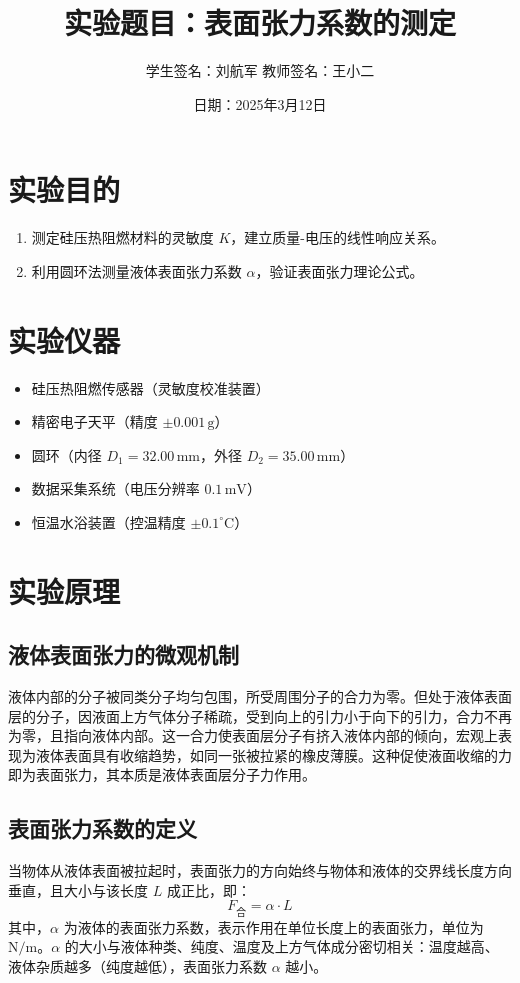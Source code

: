 \documentclass[12pt,a4paper]{article}
\title{实验题目：表面张力系数的测定}
\author{学生签名：刘航军 \quad 教师签名：王小二}
\date{日期：2025年3月12日}
\begin{document}
\maketitle

\section{实验目的}
\begin{enumerate}
\item 测定硅压热阻燃材料的灵敏度 $K$，建立质量-电压的线性响应关系。
\item 利用圆环法测量液体表面张力系数 $\alpha$，验证表面张力理论公式。
\end{enumerate}

\section{实验仪器}
\begin{itemize}
\item 硅压热阻燃传感器（灵敏度校准装置）
\item 精密电子天平（精度 $\pm 0.001 \, \text{g}$）
\item 圆环（内径 $D_1 = 32.00 \, \text{mm}$，外径 $D_2 = 35.00 \, \text{mm}$）
\item 数据采集系统（电压分辨率 $0.1 \, \text{mV}$）
\item 恒温水浴装置（控温精度 $\pm 0.1^\circ \text{C}$）
\end{itemize}

\section{实验原理}

\subsection{液体表面张力的微观机制}
液体内部的分子被同类分子均匀包围，所受周围分子的合力为零。但处于液体表面层的分子，因液面上方气体分子稀疏，受到向上的引力小于向下的引力，合力不再为零，且指向液体内部。这一合力使表面层分子有挤入液体内部的倾向，宏观上表现为液体表面具有收缩趋势，如同一张被拉紧的橡皮薄膜。这种促使液面收缩的力即为表面张力，其本质是液体表面层分子力作用。

\subsection{表面张力系数的定义}
当物体从液体表面被拉起时，表面张力的方向始终与物体和液体的交界线长度方向垂直，且大小与该长度 $L$ 成正比，即：
\begin{equation}
F_{\text{合}} = \alpha \cdot L
\end{equation}
其中，$\alpha$ 为液体的表面张力系数，表示作用在单位长度上的表面张力，单位为 $\text{N/m}$。$\alpha$ 的大小与液体种类、纯度、温度及上方气体成分密切相关：温度越高、液体杂质越多（纯度越低），表面张力系数 $\alpha$ 越小。
\end{document}
